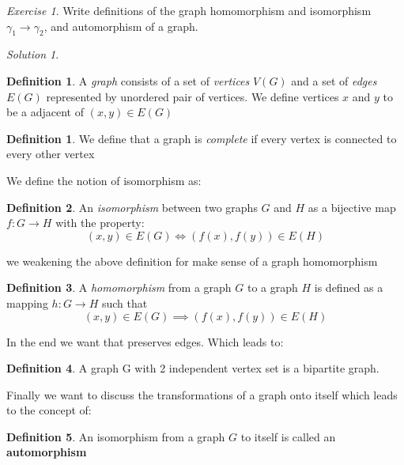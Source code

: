\documentclass[notitlepage]{article}
\theoremstyle{definition}
\newtheorem{define}{Definition}[section]
\newtheorem{defn}{Definition}[section]
\theoremstyle{remark}
\newtheorem{exc}{Exercise}
\newtheorem*{sol}{Solution}
\begin{document}
\begin{exc}
	Write definitions of the graph homomorphism and isomorphism $ \gamma_1 \rightarrow \gamma_2 $, and automorphism of a graph.
\end{exc}
\begin{sol}
	\begin{defn}
		A \textit{graph } consists of a set of \textit{vertices } $ V(G) $ and a set of \textit{edges} $ E(G) $ represented by unordered pair of vertices. We define vertices $ x $ and $ y $ to be a adjacent of $ (x,y) \in E(G) $
	\end{defn}
	\begin{define}
		We define that a graph is \textit{complete} if every vertex is connected to every other vertex 
	\end{define}
	We define the notion of isomorphism as:
	\begin{defn}
		An \textit{isomorphism} between two graphs $ G $ and $ H $ as a bijective map $ f: G \rightarrow H $ with the property:
		\[ (x,y) \in E(G) \iff (f(x),f(y)) \in E(H) \]
	\end{defn}
	we weakening the above definition for make sense of a graph homomorphism 
	\begin{defn}
		A \textit{homomorphism} from a graph $ G $ to a graph $ H $ is defined as a mapping $ h: G \rightarrow H $ such that
		\[  (x,y) \in E(G) \implies (f(x),f(y)) \in E(H) \]
	\end{defn}
	In the end we want that preserves edges. Which leads to:
	\begin{defn}
		A graph G with 2 independent vertex set is a bipartite graph. 
	\end{defn}
	Finally we want to discuss the transformations of a graph onto itself which leads to the concept of:
	\begin{defn}
		An isomorphism from a graph $ G $ to itself is called an \textbf{automorphism}
	\end{defn}
\end{sol}
\end{document}
